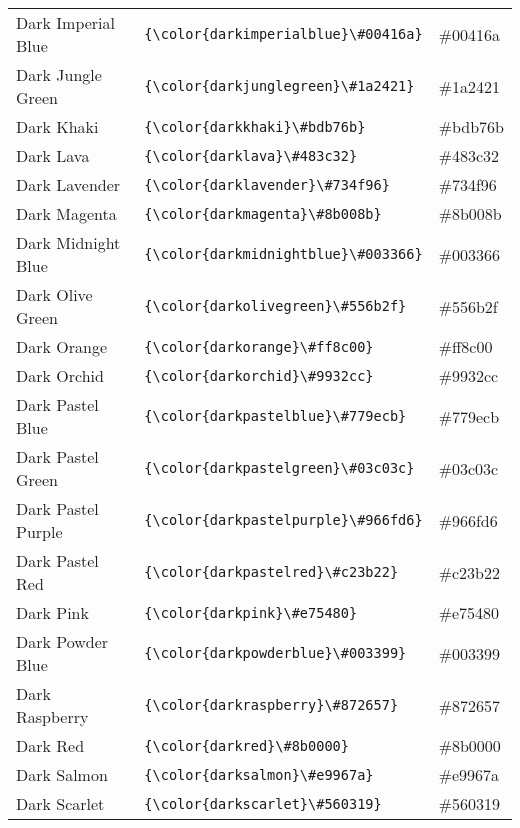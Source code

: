 \documentclass[9.5pt]{article}
\begin{document}
\begin{longtable}{l | l | l}
	Dark Imperial Blue & \verb!{\color{darkimperialblue}\#00416a}! & {\color{darkimperialblue}\#00416a}\\
	Dark Jungle Green & \verb!{\color{darkjunglegreen}\#1a2421}! & {\color{darkjunglegreen}\#1a2421}\\
	Dark Khaki & \verb!{\color{darkkhaki}\#bdb76b}! & {\color{darkkhaki}\#bdb76b}\\
	Dark Lava & \verb!{\color{darklava}\#483c32}! & {\color{darklava}\#483c32}\\
	Dark Lavender & \verb!{\color{darklavender}\#734f96}! & {\color{darklavender}\#734f96}\\
	Dark Magenta & \verb!{\color{darkmagenta}\#8b008b}! & {\color{darkmagenta}\#8b008b}\\
	Dark Midnight Blue & \verb!{\color{darkmidnightblue}\#003366}! & {\color{darkmidnightblue}\#003366}\\
	Dark Olive Green & \verb!{\color{darkolivegreen}\#556b2f}! & {\color{darkolivegreen}\#556b2f}\\
	Dark Orange & \verb!{\color{darkorange}\#ff8c00}! & {\color{darkorange}\#ff8c00}\\
	Dark Orchid & \verb!{\color{darkorchid}\#9932cc}! & {\color{darkorchid}\#9932cc}\\
	Dark Pastel Blue & \verb!{\color{darkpastelblue}\#779ecb}! & {\color{darkpastelblue}\#779ecb}\\
	Dark Pastel Green & \verb!{\color{darkpastelgreen}\#03c03c}! & {\color{darkpastelgreen}\#03c03c}\\
	Dark Pastel Purple & \verb!{\color{darkpastelpurple}\#966fd6}! & {\color{darkpastelpurple}\#966fd6}\\
	Dark Pastel Red & \verb!{\color{darkpastelred}\#c23b22}! & {\color{darkpastelred}\#c23b22}\\
	Dark Pink & \verb!{\color{darkpink}\#e75480}! & {\color{darkpink}\#e75480}\\
	Dark Powder Blue & \verb!{\color{darkpowderblue}\#003399}! & {\color{darkpowderblue}\#003399}\\
	Dark Raspberry & \verb!{\color{darkraspberry}\#872657}! & {\color{darkraspberry}\#872657}\\
	Dark Red & \verb!{\color{darkred}\#8b0000}! & {\color{darkred}\#8b0000}\\
	Dark Salmon & \verb!{\color{darksalmon}\#e9967a}! & {\color{darksalmon}\#e9967a}\\
	Dark Scarlet & \verb!{\color{darkscarlet}\#560319}! & {\color{darkscarlet}\#560319}\\

\end{longtable}
\end{document}
